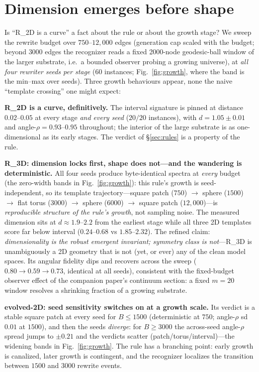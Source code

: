 \documentclass[11pt]{article}
\begin{document}
\section{Dimension emerges before shape}\label{sec:growth}
Is ``R\_2D is a curve'' a fact about the rule or about the growth stage? We
sweep the rewrite budget over $750$--$12{,}000$ edges (generation cap scaled
with the budget; beyond $3000$ edges the recognizer reads a fixed 2000-node
geodesic-ball window of the larger substrate, i.e.\ a bounded observer probing
a growing universe), at \emph{all four rewriter seeds per stage} ($60$
instances; Fig.~\ref{fig:growth}, where the band is the min--max over seeds).
Three growth behaviours appear, none the naive ``template crossing'' one might
expect:

\textbf{R\_2D is a curve, definitively.} The interval signature is pinned at
distance $0.02$--$0.05$ at every stage \emph{and every seed} ($20/20$
instances), with $d=1.05\pm0.01$ and angle-$\rho=0.93$--$0.95$ throughout;
the interior of the large substrate is as one-dimensional as its early
stages. The verdict of \S\ref{sec:rules} is a property of the rule.

\textbf{R\_3D: dimension locks first, shape does not---and the wandering is
deterministic.} All four seeds produce byte-identical spectra at \emph{every}
budget (the zero-width bands in Fig.~\ref{fig:growth}): this rule's growth is
seed-independent, so its template trajectory---square patch ($750$) $\to$
sphere ($1500$) $\to$ flat torus ($3000$) $\to$ sphere ($6000$) $\to$ square
patch ($12{,}000$)---is \emph{reproducible structure of the rule's growth},
not sampling noise. The measured dimension sits at $d\approx1.9$--$2.2$ from
the earliest stage while all three 2D templates score far below interval
($0.24$--$0.68$ vs $1.85$--$2.32$). The refined claim:
\emph{dimensionality is the robust emergent invariant; symmetry class is
not}---R\_3D is unambiguously a 2D geometry that is not (yet, or ever) any of
the clean model spaces. Its angular fidelity dips and recovers across the
sweep ($0.80\to0.59\to0.73$, identical at all seeds), consistent with the
fixed-budget observer effect of the companion paper's continuum section: a
fixed $m=20$ window resolves a shrinking fraction of a growing substrate.

\textbf{evolved-2D: seed sensitivity switches on at a growth scale.} Its
verdict is a stable square patch at every seed for $B\le1500$
(deterministic at $750$; angle-$\rho$ sd $0.01$ at $1500$), and then the
seeds \emph{diverge}: for $B\ge3000$ the across-seed angle-$\rho$ spread
jumps to $\pm0.21$ and the verdicts scatter (patch/torus/interval)---the
widening bands in Fig.~\ref{fig:growth}. The rule has a branching point:
early growth is canalized, later growth is contingent, and the recognizer
localizes the transition between $1500$ and $3000$ rewrite events.
\end{document}
